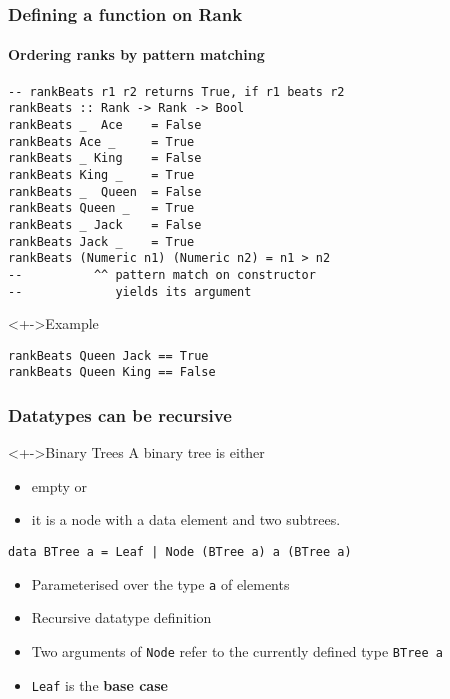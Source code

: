 \documentclass{beamer}
\begin{document}
\begin{frame}[fragile]
  \frametitle{Defining a function on Rank}
  \framesubtitle{Ordering ranks by pattern matching}
\begin{lstlisting}
-- rankBeats r1 r2 returns True, if r1 beats r2
rankBeats :: Rank -> Rank -> Bool
rankBeats _  Ace    = False
rankBeats Ace _     = True
rankBeats _ King    = False
rankBeats King _    = True
rankBeats _  Queen  = False
rankBeats Queen _   = True
rankBeats _ Jack    = False
rankBeats Jack _    = True
rankBeats (Numeric n1) (Numeric n2) = n1 > n2
--          ^^ pattern match on constructor
--             yields its argument
\end{lstlisting}

  \begin{exampleblock}<+->{Example}
\begin{lstlisting}
rankBeats Queen Jack == True
rankBeats Queen King == False
\end{lstlisting}
  \end{exampleblock}
\end{frame}
\begin{frame}[fragile]
  \frametitle{Datatypes can be recursive}
  \begin{block}<+->{Binary Trees}
    A binary tree is either
    \begin{itemize}
    \item empty or
    \item it is a node with a data element and two subtrees.
    \end{itemize}
\begin{lstlisting}
data BTree a = Leaf | Node (BTree a) a (BTree a)
\end{lstlisting}
  \begin{itemize}
  \item Parameterised over the type \lstinline{a} of elements
  \item Recursive datatype definition
  \item Two arguments of \lstinline{Node} refer to the currently
    defined type \lstinline{BTree a}
  \item  \lstinline{Leaf} is the \textbf{base case}
  \end{itemize}
  \end{block}
\end{frame}
\end{document}
